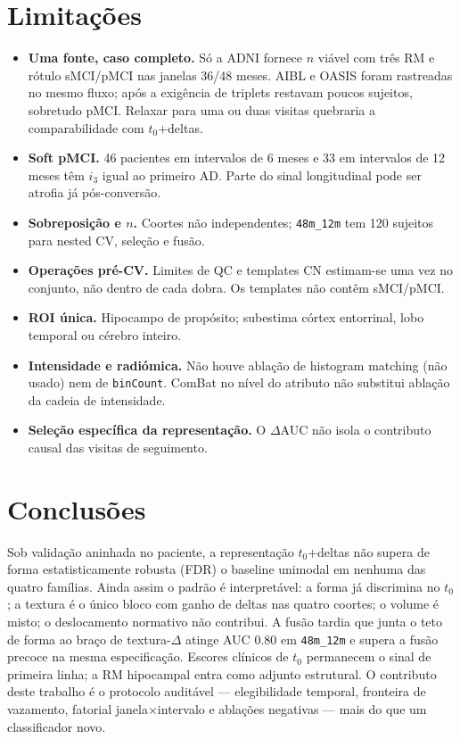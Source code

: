 \documentclass[review]{elsarticle}
\newcommand{\code}[1]{\texttt{#1}}
\begin{document}
	\section{Limitações}
	\label{sec:limitacao}
	
	\begin{itemize}
		\item \textbf{Uma fonte, caso completo.} Só a ADNI fornece $n$ viável com três RM e rótulo sMCI/pMCI nas janelas 36/48 meses.
		AIBL e OASIS foram rastreadas no mesmo fluxo; após a exigência de triplets restavam poucos sujeitos, sobretudo pMCI.
		Relaxar para uma ou duas visitas quebraria a comparabilidade com $t_0$+deltas.
		\item \textbf{Soft pMCI.} 46 pacientes em intervalos de 6 meses e 33 em intervalos de 12 meses têm $i_3$ igual ao primeiro AD.
		Parte do sinal longitudinal pode ser atrofia já pós-conversão.
		\item \textbf{Sobreposição e $n$.} Coortes não independentes; \code{48m\_12m} tem 120 sujeitos para nested CV, seleção e fusão.
		\item \textbf{Operações pré-CV.} Limites de QC e templates CN estimam-se uma vez no conjunto, não dentro de cada dobra.
		Os templates não contêm sMCI/pMCI.
		\item \textbf{ROI única.} Hipocampo de propósito; subestima córtex entorrinal, lobo temporal ou cérebro inteiro.
		\item \textbf{Intensidade e radiómica.} Não houve ablação de histogram matching (não usado) nem de \code{binCount}.
		ComBat no nível do atributo não substitui ablação da cadeia de intensidade.
		\item \textbf{Seleção específica da representação.} O $\Delta$AUC não isola o contributo causal das visitas de seguimento.
	\end{itemize}
	
	\section{Conclusões}
	\label{sec:conclusoes}
	
	Sob validação aninhada no paciente, a representação $t_0$+deltas não supera de forma estatisticamente robusta (FDR) o baseline unimodal em nenhuma das quatro famílias.
	Ainda assim o padrão é interpretável: a forma já discrimina no $t_0$; a textura é o único bloco com ganho de deltas nas quatro coortes; o volume é misto; o deslocamento normativo não contribui.
	A fusão tardia que junta o teto de forma ao braço de textura-$\Delta$ atinge AUC $0.80$ em \code{48m\_12m} e supera a fusão precoce na mesma especificação.
	Escores clínicos de $t_0$ permanecem o sinal de primeira linha; a RM hipocampal entra como adjunto estrutural.
	O contributo deste trabalho é o protocolo auditável --- elegibilidade temporal, fronteira de vazamento, fatorial janela$\times$intervalo e ablações negativas --- mais do que um classificador novo.
	
\end{document}
